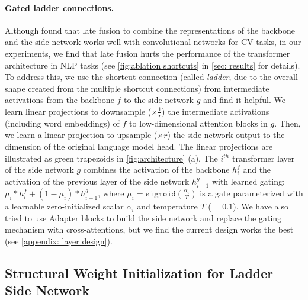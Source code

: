 \paragraph{Gated ladder connections.} Although \citet{Zhang2019SideTuningNA} found that late fusion to combine the representations of the backbone and the side network works well with convolutional networks for CV tasks, in our experiments, we find that late fusion hurts the performance of the transformer architecture in NLP tasks (see \ref{fig:ablation shortcuts} in \ref{sec: results} for details). To address this, we use the shortcut connection (called \textit{ladder}, due to the overall shape created from the multiple shortcut connections) from intermediate activations from the backbone $f$ to the side network $g$ and find it helpful. We learn linear projections to downsample ($\times \frac{1}{r}$) the intermediate activations (including word embeddings) of $f$ to low-dimensional attention blocks in $g$. Then, we learn a linear projection to upsample ($\times r$) the side network output to the dimension of the original language model head. The linear projections are illustrated as green trapezoids in \ref{fig:architecture} (a). The $i^{th}$ transformer layer of the side network $g$ combines the activation of the backbone $h^{f}_i$ and the activation of the previous layer of the side network $h^{g}_{i-1}$ with learned gating: $\mu_i * h^{f}_i + (1-\mu_i) * h^{g}_{i-1}$, where
$\mu_i = \texttt{sigmoid}(\frac{\alpha_{i}}{T})$ is a gate parameterized with a learnable zero-initialized scalar $\alpha_{i}$ and temperature $T$ ($=0.1$). We have also tried to use Adapter blocks to build the side network and replace the gating mechanism with cross-attentions, but we find the current design works the best (see \ref{appendix: layer design}).

\subsection{Structural Weight Initialization for Ladder Side Network}
\label{sec: weight init}

